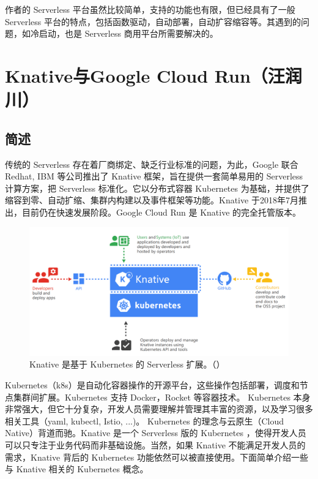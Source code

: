 \documentclass[11pt]{article}
\begin{document}
作者的 Serverless 平台虽然比较简单，支持的功能也有限，但已经具有了一般 Serverless 平台的特点，包括函数驱动，自动部署，自动扩容缩容等。其遇到的问题，如冷启动，也是 Serverless 商用平台所需要解决的。

\section{Knative与Google Cloud Run（汪润川）}

\subsection{简述}
传统的 Serverless 存在着厂商绑定、缺乏行业标准的问题，为此，Google 联合 Redhat, IBM 等公司推出了 Knative 框架，旨在提供一套简单易用的 Serverless 计算方案，把 Serverless 标准化。它以分布式容器 Kubernetes 为基础，并提供了缩容到零、自动扩缩、集群内构建以及事件框架等功能。Knative 于2018年7月推出，目前仍在快速发展阶段。Google Cloud Run 是 Knative 的完全托管版本。

\begin{figure}[!htbp]
	\centering
	\includegraphics[width=1.0\linewidth]{figs/knative-audience}
	\caption{Knative 是基于 Kubernetes 的 Serverless 扩展。（\cite{knative-audiance}）}
	\label{figs:knative-audience}
\end{figure}


Kubernetes（k8s）是自动化容器操作的开源平台，这些操作包括部署，调度和节点集群间扩展。Kubernetes 支持 Docker，Rocket 等容器技术。 Kubernetes 本身非常强大，但它十分复杂，开发人员需要理解并管理其丰富的资源，以及学习很多相关工具（yaml, kubectl, Istio, ...)。 Kubernetes 的理念与云原生（Cloud Native）背道而驰。Knative 是一个 Serverless 版的 Kubernetes ，使得开发人员可以只专注于业务代码而非基础设施。当然，如果 Knative 不能满足开发人员的需求，Knative 背后的 Kubernetes 功能依然可以被直接使用。下面简单介绍一些与 Knative 相关的 Kubernetes 概念。
\end{document}
